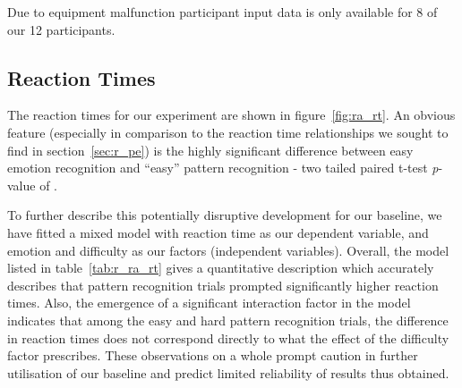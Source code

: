 	Due to equipment malfunction participant input data is only available for 8 of our 12 participants.
	\subsection{Reaction Times}\label{sec:r_ra_rt}
	    The reaction times for our experiment are shown in figure~\ref{fig:ra_rt}.
	    An obvious feature (especially in comparison to the reaction time relationships we sought to find in section~\ref{sec:r_pe}) is the highly significant difference between easy emotion recognition and “easy” pattern recognition -
	    two tailed paired t-test \textit{p}-value of .
	    
	    To further describe this potentially disruptive development for our baseline, we have fitted a mixed model with reaction time as our dependent variable, and emotion and difficulty as our factors (independent variables).
	    Overall, the model listed in table~\ref{tab:r_ra_rt} gives a quantitative description which accurately describes that pattern recognition trials prompted significantly higher reaction times.
	    Also, the emergence of a significant interaction factor in the model indicates that among the easy and hard pattern recognition trials, the difference in reaction times does not correspond directly to what the effect of the difficulty factor prescribes.
	    These observations on a whole prompt caution in further utilisation of our baseline and predict limited reliability of results thus obtained.

